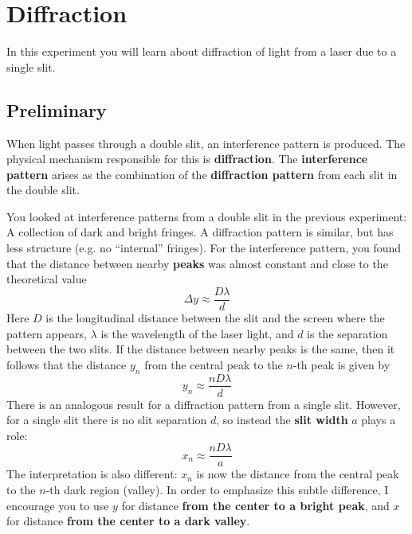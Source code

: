 \setcounter{chapter}{10}
\chapter{Diffraction}
%
In this experiment you will learn about diffraction of light from a laser due to a single slit.
%
\section{Preliminary}
%
When light passes through a double slit, an interference pattern is produced. The physical mechanism responsible for this is \textbf{diffraction}. The \textbf{interference pattern} arises as the combination of the \textbf{diffraction pattern} from each slit in the double slit.

You looked at interference patterns from a double slit in the previous experiment: A collection of dark and bright fringes. A diffraction pattern is similar, but has less structure (e.g. no ``internal'' fringes). For the interference pattern, you found that the distance between nearby \textbf{peaks} was almost constant and close to the theoretical value
\begin{equation}
    \Delta y \approx \frac{D \lambda}{d}
\end{equation}
Here $D$ is the longitudinal distance between the slit and the screen where the pattern appears, $\lambda$ is the wavelength of the laser light, and $d$ is the separation between the two slits. If the distance between nearby peaks is the same, then it follows that the distance $y_{n}$ from the central peak to the $n$-th peak is given by
\begin{equation}
    y_{n} \approx \frac{n D \lambda}{d}
\end{equation}
There is an analogous result for a diffraction pattern from a single slit. However, for a single slit there is no slit separation $d$, so instead the \textbf{slit width} $a$ plays a role:
\begin{equation}
    x_{n} \approx \frac{n D \lambda}{a}
\end{equation}
The interpretation is also different: $x_{n}$ is now the distance from the central peak to the $n$-th dark region (valley). In order to emphasize this subtle difference, I encourage you to use $y$ for distance \textbf{from the center to a bright peak}, and $x$ for distance \textbf{from the center to a dark valley}.
%
